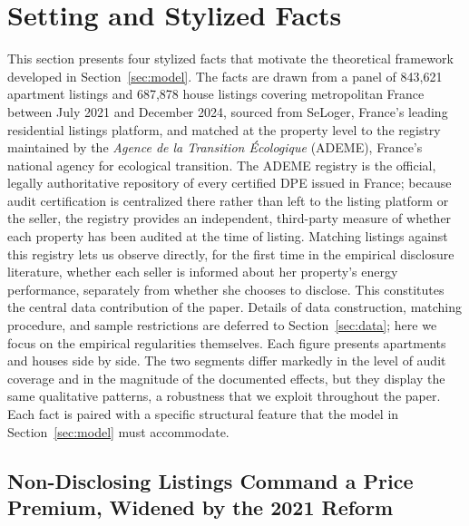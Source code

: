 \documentclass[10pt,letterpaper]{bp-template-concise}
\begin{document}
\section{Setting and Stylized Facts}
\label{sec:facts}

This section presents four stylized facts that motivate the theoretical framework developed in Section~\ref{sec:model}. The facts are drawn from a panel of 843{,}621 apartment listings and 687{,}878 house listings covering metropolitan France between July 2021 and December 2024, sourced from SeLoger, France's leading residential listings platform, and matched at the property level to the registry maintained by the \emph{Agence de la Transition \'Ecologique} (ADEME), France's national agency for ecological transition. The ADEME registry is the official, legally authoritative repository of every certified DPE issued in France; because audit certification is centralized there rather than left to the listing platform or the seller, the registry provides an independent, third-party measure of whether each property has been audited at the time of listing. Matching listings against this registry lets us observe directly, for the first time in the empirical disclosure literature, whether each seller is informed about her property's energy performance, separately from whether she chooses to disclose. This constitutes the central data contribution of the paper. Details of data construction, matching procedure, and sample restrictions are deferred to Section~\ref{sec:data}; here we focus on the empirical regularities themselves. Each figure presents apartments and houses side by side. The two segments differ markedly in the level of audit coverage and in the magnitude of the documented effects, but they display the same qualitative patterns, a robustness that we exploit throughout the paper. Each fact is paired with a specific structural feature that the model in Section~\ref{sec:model} must accommodate.

\subsection{Non-Disclosing Listings Command a Price Premium, Widened by the 2021 Reform}
\label{ss:fact1}
\end{document}
